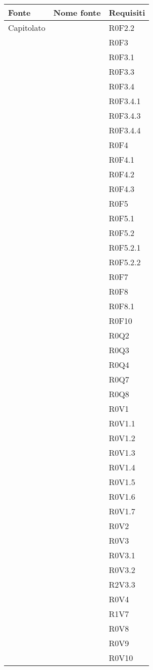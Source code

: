 \documentclass[AnalisiDeiRequisiti.tex]{subfiles}
\begin{document}
\renewcommand*{\arraystretch}{1.2}
\begin{longtable}[H]{p{2cm}p{5cm}p{5cm}}
	\rowcolor{CHeader} 
	\color{CHeaderText} \textbf{Fonte} & \color{CHeaderText} \textbf{Nome fonte} & \color{CHeaderText} \textbf{Requisiti} \\  
	\endhead
	Capitolato & & R0F2.2 \\
	& & R0F3 \\
	& & R0F3.1 \\
	& & R0F3.3 \\
	& & R0F3.4 \\
	& & R0F3.4.1 \\
	& & R0F3.4.3 \\
	& & R0F3.4.4 \\
	& & R0F4 \\
	& & R0F4.1 \\
	& & R0F4.2 \\
	& & R0F4.3 \\
	& & R0F5 \\
	& & R0F5.1 \\
	& & R0F5.2 \\
	& & R0F5.2.1 \\
	& & R0F5.2.2 \\
	& & R0F7 \\
	& & R0F8 \\
	& & R0F8.1 \\
	& & R0F10 \\
	& & R0Q2 \\
	& & R0Q3 \\
	& & R0Q4 \\
	& & R0Q7 \\
	& & R0Q8 \\
	& & R0V1 \\
	& & R0V1.1 \\
	& & R0V1.2 \\
	& & R0V1.3 \\
	& & R0V1.4 \\
	& & R0V1.5 \\
	& & R0V1.6 \\
	& & R0V1.7 \\
	& & R0V2 \\
	& & R0V3 \\
	& & R0V3.1 \\
	& & R0V3.2 \\
	& & R2V3.3 \\
	& & R0V4 \\
	& & R1V7 \\
	& & R0V8 \\
	& & R0V9 \\
	& & R0V10 \\  
	

\end{longtable}
\end{document}
